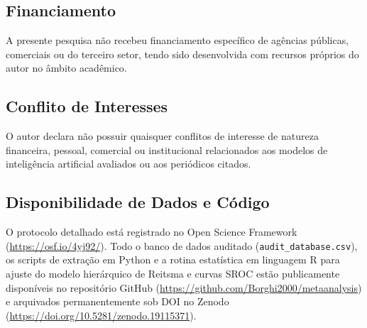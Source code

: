 \documentclass[12pt,a4paper]{article}
\begin{document}
\subsection*{Financiamento}
A presente pesquisa não recebeu financiamento específico de agências públicas, comerciais ou do terceiro setor, tendo sido desenvolvida com recursos próprios do autor no âmbito acadêmico.

\subsection*{Conflito de Interesses}
O autor declara não possuir quaisquer conflitos de interesse de natureza financeira, pessoal, comercial ou institucional relacionados aos modelos de inteligência artificial avaliados ou aos periódicos citados.

\subsection*{Disponibilidade de Dados e Código}
O protocolo detalhado está registrado no Open Science Framework (\url{https://osf.io/4yj92/}). Todo o banco de dados auditado (\texttt{audit\_database.csv}), os scripts de extração em Python e a rotina estatística em linguagem R para ajuste do modelo hierárquico de Reitsma e curvas SROC estão publicamente disponíveis no repositório GitHub (\url{https://github.com/Borghi2000/metaanalysis}) e arquivados permanentemente sob DOI no Zenodo (\url{https://doi.org/10.5281/zenodo.19115371}).
\end{document}
